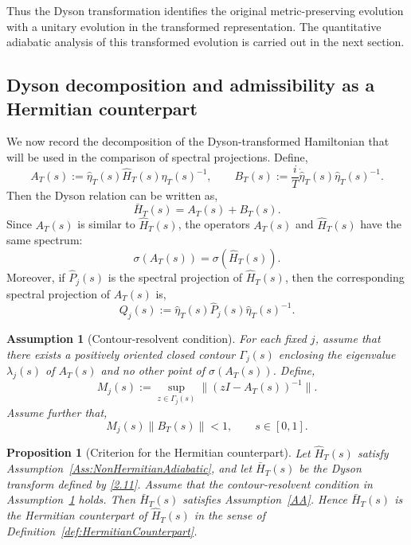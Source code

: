\documentclass[pdflatex,sn-mathphys-num]{sn-jnl}
\theoremstyle{thmstyleone}
\newtheorem{proposition}[theorem]{Proposition}
\theoremstyle{thmstyletwo}
\theoremstyle{thmstylethree}
\newtheorem{assumption}[theorem]{Assumption}
\begin{document}
Thus the Dyson transformation identifies the original metric-preserving evolution with
a unitary evolution in the transformed representation. The quantitative adiabatic
analysis of this transformed evolution is carried out in the next section.

\subsection{Dyson decomposition and admissibility as a Hermitian counterpart}

We now record the decomposition of the Dyson-transformed Hamiltonian that will
be used in the comparison of spectral projections. Define,
\[
A_T(s):=\hat\eta_T(s)\hat H_T(s)\hat\eta_T(s)^{-1},
\qquad
B_T(s):=\frac{i}{T}\dot{\hat\eta}_T(s)\hat\eta_T(s)^{-1}.
\]
Then the Dyson relation can be written as,
\[
\bar H_T(s)=A_T(s)+B_T(s).
\]
Since \(A_T(s)\) is similar to \(\hat H_T(s)\), the operators \(A_T(s)\) and
\(\hat H_T(s)\) have the same spectrum:
\[
\sigma(A_T(s))=\sigma(\hat H_T(s)).
\]
Moreover, if \(\hat P_j(s)\) is the spectral projection of \(\hat H_T(s)\), then
the corresponding spectral projection of \(A_T(s)\) is,
\[
Q_j(s):=\hat\eta_T(s)\hat P_j(s)\hat\eta_T(s)^{-1}.
\]
\begin{assumption}[Contour-resolvent condition]
\label{Ass:ContourResolvent}
For each fixed \(j\), assume that there exists a positively oriented closed
contour \(\Gamma_j(s)\)
enclosing the eigenvalue \(\lambda_j(s)\) of \(A_T(s)\) and no other
point of \(\sigma(A_T(s))\). Define,
\[
M_j(s):=
\sup_{z\in\Gamma_j(s)}
\|(zI-A_T(s))^{-1}\|.
\]
Assume further that,
\[
M_j(s)\|B_T(s)\|<1,
\qquad s\in[0,1].
\]
\end{assumption}

\begin{proposition}[Criterion for the Hermitian counterpart]
\label{prop:CriterionHermitianCounterpart}
Let \(\hat H_T(s)\) satisfy Assumption~\ref{Ass:NonHermitianAdiabatic}, and let
\(\bar H_T(s)\) be the Dyson transform defined by \eqref{2.11}. Assume that the
contour-resolvent condition in Assumption~\ref{Ass:ContourResolvent} holds.
Then \(\bar H_T(s)\) satisfies Assumption~\ref{AA}. Hence \(\bar H_T(s)\) is the
Hermitian counterpart of \(\hat H_T(s)\) in the sense of
Definition~\ref{def:HermitianCounterpart}.
\end{proposition}
\end{document}
